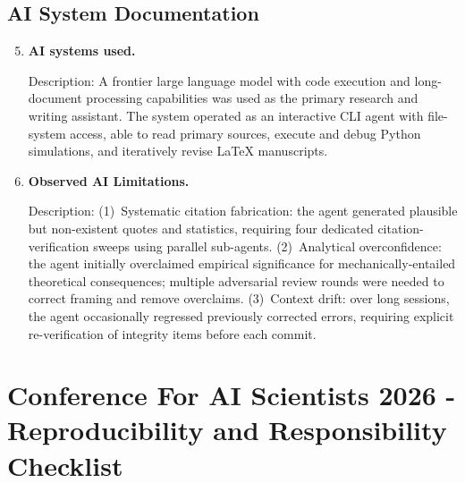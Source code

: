 \documentclass{article}
\begin{document}
\subsection*{AI System Documentation}

\begin{enumerate}
  \setcounter{enumi}{4}

  \item \textbf{AI systems used.}

    Description: A frontier large language model with code execution and long-document processing capabilities was used as the primary research and writing assistant. The system operated as an interactive CLI agent with file-system access, able to read primary sources, execute and debug Python simulations, and iteratively revise LaTeX manuscripts.

  \item \textbf{Observed AI Limitations.}

    Description: (1)~Systematic citation fabrication: the agent generated plausible but non-existent quotes and statistics, requiring four dedicated citation-verification sweeps using parallel sub-agents. (2)~Analytical overconfidence: the agent initially overclaimed empirical significance for mechanically-entailed theoretical consequences; multiple adversarial review rounds were needed to correct framing and remove overclaims. (3)~Context drift: over long sessions, the agent occasionally regressed previously corrected errors, requiring explicit re-verification of integrity items before each commit.

\end{enumerate}

\newpage

\section*{Conference For AI Scientists 2026 - Reproducibility and Responsibility Checklist}
\label{checklist_reproducibility}
\end{document}
